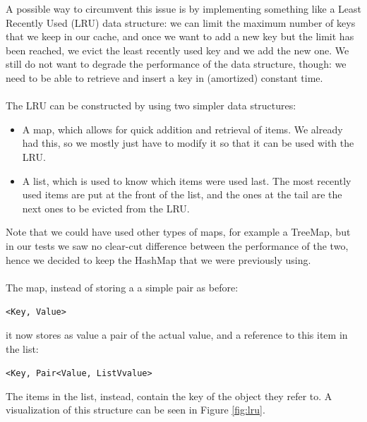 A possible way to circumvent this issue is by implementing something like a Least Recently Used (LRU) data structure: we can limit the maximum number of keys that we keep in our cache, and once we want to add a new key but the limit has been reached, we evict the least recently used key and we add the new one. We still do not want to degrade the performance of the data structure, though: we need to be able to retrieve and insert a key in (amortized) constant time.
\\\\
The LRU can be constructed by using two simpler data structures:
\begin{itemize}  
  \item A map, which allows for quick addition and retrieval of items. We already had this, so we mostly just have to modify it so that it can be used with the LRU.
  \item A list, which is used to know which items were used last. The most recently used items are put at the front of the list, and the ones at the tail are the next ones to be evicted from the LRU.
\end{itemize}
Note that we could have used other types of maps, for example a TreeMap, but in our tests we saw no clear-cut difference between the performance of the two, hence we decided to keep the HashMap that we were previously using.
\\\\
The map, instead of storing a a simple pair as before:
\begin{center}
  \texttt{<Key, Value>}
\end{center}
it now stores as value a pair of the actual value, and a reference to this item in the list:
\begin{center}
  \texttt{<Key, Pair<Value, ListVvalue>}
\end{center}
The items in the list, instead, contain the key of the object they refer to. A visualization of this structure can be seen in Figure \ref{fig:lru}.

